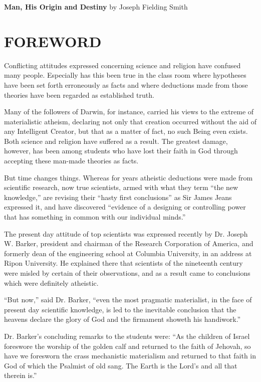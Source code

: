 \begin{flushleft}
\fontsize{35}{35}\sffamily
\textbf{Man, His Origin and Destiny}
\Large{by Joseph Fielding Smith}
\end{flushleft}

\section{FOREWORD}
\thispagestyle{empty}

Conflicting attitudes expressed concerning science and religion have confused many people.
Especially has this been true in the class room where hypotheses have been set forth
erroneously as facts and where deductions made from those theories have been regarded as
established truth.

Many of the followers of Darwin, for instance, carried his views to the extreme of
materialistic atheism, declaring not only that creation occurred without the aid of any
Intelligent Creator, but that as a matter of fact, no such Being even exists.
Both science and religion have suffered as a result. The greatest damage, however, has been
among students who have lost their faith in God through accepting these man-made theories
as facts.

But time changes things. Whereas for years atheistic deductions were made from scientific
research, now true scientists, armed with what they term ``the new knowledge,'' are revising
their ``hasty first conclusions'' as Sir James Jeans expressed it, and have discovered ``evidence
of a designing or controlling power that has something in common with our individual
minds.''

The present day attitude of top scientists was expressed recently by Dr. Joseph W. Barker,
president and chairman of the Research Corporation of America, and formerly dean of the
engineering school at Columbia University, in an address at Ripon University. He explained
there that scientists of the nineteenth century were misled by certain of their observations,
and as a result came to conclusions which were definitely atheistic.

``But now,'' said Dr. Barker, ``even the most pragmatic materialist, in the face of present day
scientific knowledge, is led to the inevitable conclusion that the heavens declare the glory of
God and the firmament showeth his handiwork.''

Dr. Barker's concluding remarks to the students were: ``As the children of Israel foreswore
the worship of the golden calf and returned to the faith of Jehovah, so have we foresworn the
crass mechanistic materialism and returned to that faith in God of which the Psalmist of old
sang. The Earth is the Lord's and all that therein is.''

